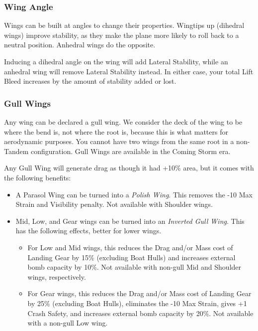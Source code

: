 \documentclass{article}
\begin{document}
\subsubsection{Wing Angle}
\label{_Wing Angle}

Wings can be built at angles to change their properties. Wingtips up
(dihedral wings) improve stability, as they make the plane more likely
to roll back to a neutral position. Anhedral wings do the opposite.

Inducing a dihedral angle on the wing will add Lateral Stability, while
an anhedral wing will remove Lateral Stability instead. In either case,
your total Lift Bleed increases by the amount of stability added or
lost.

\subsubsection{Gull Wings}
\label{_Gull Wings}

Any wing can be declared a gull wing. We consider the deck of the wing
to be where the bend is, not where the root is, because this is what
matters for aerodynamic purposes. You cannot have two wings from the
same root in a non-Tandem configuration. Gull Wings are available in the
Coming Storm era.

Any Gull Wing will generate drag as though it had +10\% area, but it
comes with the following benefits:

\begin{itemize}
    \item          {A Parasol Wing can be turned into a }\emph{{Polish
                      Wing}}{. This removes the -10 Max Strain and Visibility penalty.
              Not available with Shoulder wings.}
    \item          {Mid, Low, and Gear wings can be turned into an
          }\emph{Inverted Gull Wing}{. This has the following
              effects, better for lower wings.}

          \begin{itemize}
              \item                    For Low and Mid wings, this reduces the Drag and/or Mass cost
                    of Landing Gear by 15\% (excluding Boat Hulls) and increases
                    external bomb capacity by 10\%. Not available with non-gull Mid and
                    Shoulder wings, respectively.
              \item                    For Gear wings, this reduces the Drag and/or Mass cost of
                    Landing Gear by 25\% (excluding Boat Hulls), eliminates the -10 Max
                    Strain, gives +1 Crash Safety, and increases external bomb capacity
                    by 20\%. Not available with a non-gull Low wing.
          \end{itemize}
\end{itemize}
\end{document}
